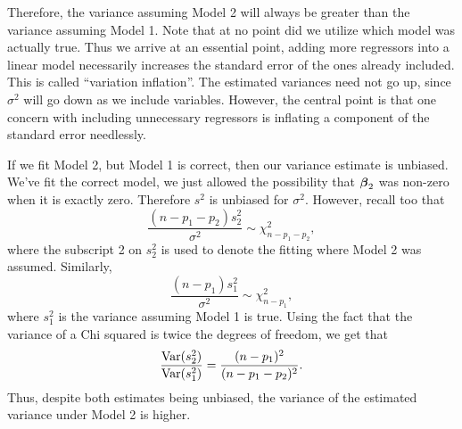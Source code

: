 Therefore, the variance assuming Model 2 will always be greater than the variance assuming Model 1.
Note that at no point did we utilize which model was actually true. Thus we arrive at an
essential point, adding more regressors into a linear model necessarily increases the
standard error of the ones already included. This is called ``variation inflation''. The
estimated variances need not go up, since $\sigma^2$ will go down as we include variables. 
However, the central point is that one concern with including unnecessary regressors
is inflating a component of the standard error needlessly. 



If we fit Model 2, but Model 1 is correct, then our variance estimate is 
unbiased. We've fit the correct model, we just allowed the possibility that
$\boldsymbol{\beta}_2$ was non-zero when it is exactly zero. Therefore $s^2$ is unbiased
for $\sigma^2$. However, recall too that
$$
\frac{(n-p_1 - p_2)s^2_2}{\sigma^2} \sim \chi^2_{n-p_1 - p_2},
$$
where the subscript 2 on $s^2_2$ is used to denote the fitting where Model 2 was assumed.
Similarly,
$$
 \frac{(n-p_1)s^2_1}{\sigma^2} \sim \chi^2_{n-p_1},
$$
where $s_1^2$ is the variance assuming Model 1 is true. Using the fact that the variance
of a Chi squared is twice the degrees of freedom, we get that
$$
\frac{\mbox{Var}(s_2^2)}{\mbox{Var}(s_1^2)} = \frac{(n - p_1)^2}{(n - p_1 - p_2)^2}.
$$
Thus, despite both estimates being unbiased, the variance of the estimated variance
under Model 2 is higher.





